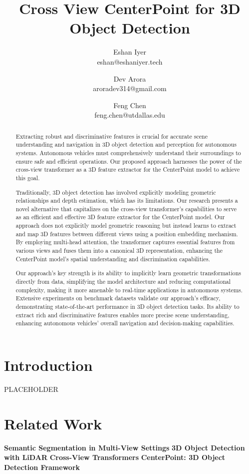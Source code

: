 \documentclass[twocolumn, times]{article}
\title{\textbf{Cross View CenterPoint for 3D Object Detection}}
\author{Eshan Iyer \\ eshan@eshaniyer.tech  \and Dev Arora \\ aroradev314@gmail.com \and Feng Chen \\feng.chen@utdallas.edu }
\date{}
\begin{document}
\maketitle

\begin{abstract}
Extracting robust and discriminative features is crucial for accurate scene understanding and navigation in 3D object detection and perception for autonomous systems. Autonomous vehicles must comprehensively understand their surroundings to ensure safe and efficient operations. Our proposed approach harnesses the power of the cross-view transformer as a 3D feature extractor for the CenterPoint model to achieve this goal.

Traditionally, 3D object detection has involved explicitly modeling geometric relationships and depth estimation, which has its limitations. Our research presents a novel alternative that capitalizes on the cross-view transformer's capabilities to serve as an efficient and effective 3D feature extractor for the CenterPoint model. Our approach does not explicitly model geometric reasoning but instead learns to extract and map 3D features between different views using a position embedding mechanism. By employing multi-head attention, the transformer captures essential features from various views and fuses them into a canonical 3D representation, enhancing the CenterPoint model's spatial understanding and discrimination capabilities.

Our approach's key strength is its ability to implicitly learn geometric transformations directly from data, simplifying the model architecture and reducing computational complexity, making it more amenable to real-time applications in autonomous systems. Extensive experiments on benchmark datasets validate our approach's efficacy, demonstrating state-of-the-art performance in 3D object detection tasks. Its ability to extract rich and discriminative features enables more precise scene understanding, enhancing autonomous vehicles' overall navigation and decision-making capabilities.
\end{abstract}

\section{Introduction}
PLACEHOLDER

\section{Related Work}
\textbf{Semantic Segmentation in Multi-View Settings}
\newline \newline
\textbf{3D Object Detection with LiDAR}
\newline \newline
\textbf{Cross-View Transformers}
\newline \newline
\textbf{CenterPoint: 3D Object Detection Framework}
\newline \newline
\end{document}
